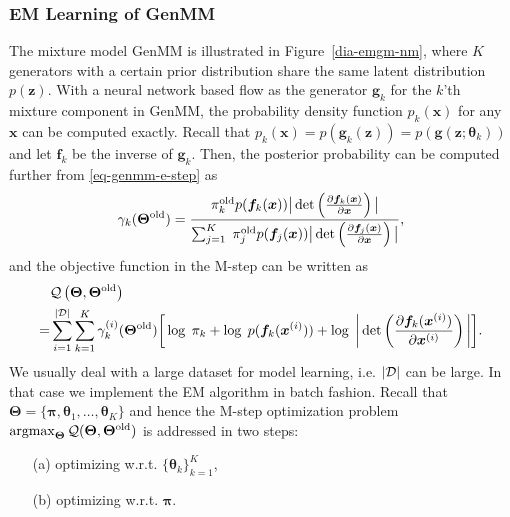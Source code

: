 \subsubsection{EM Learning of GenMM}
\label{sec-algo-genmm}
The mixture model GenMM is illustrated in Figure~\ref{dia-emgm-nm},
where $K$ generators with a certain prior distribution share the same
latent distribution $p(\bm{z})$. With a neural network based flow as the generator $\bm{g}_k$ for the $k$'th mixture component in GenMM, the probability density function $p_k(\bm{x})$ for any
$\bm{x}$ can be computed exactly. Recall that $p_k(\bm{x}) =  p(\bm{g}_k(\bm{z})) =p(\bm{g}(\bm{z};\bm{\theta}_k))$ and let $\bm{f}_k$ be the inverse of $\bm{g}_k$. Then, the posterior probability can be computed further from \eqref{eq-genmm-e-step} as
\begin{align}\label{eq-genmm-gamma}
  \gamma_k({\bm{\Theta}}^{\mathrm{old}}) = \frac{\pi_k^{\mathrm{old}} p(\bm{f}_k(\bm{x})) \big|\det\left( \frac{ \partial \bm{f}_k(\bm{x})}{\partial \bm{x}} \right)\big|}{\sum_{j=1}^K\; \pi_j^{\mathrm{old}} p(\bm{f}_j(\bm{x})) \big|\det\left( \frac{ \partial \bm{f}_j(\bm{x})}{\partial \bm{x}} \right)\big|},
\end{align}
and the objective function in the M-step can be written as
\begin{align}\label{eq-genmm-obj}
  &\mathcal{Q}\left(\bm{\Theta},\bm{\Theta}^{\mathrm{old}}\right)  \nonumber\\
  =&\sum_{i=1}^{| \mathcal{D} |} \sum_{k=1}^{K}\gamma_k^{(i)}(\bm{\Theta}^{\mathrm{old}})\bigg[ \log\;\pi_k +\log\;p(\bm{f}_k(\bm{x}^{(i)})) + \log\;\bigg|\det\left(\frac{ \partial \bm{f}_k(\bm{x}^{(i)})}{\partial \bm{x}^{(i)}} \right)\bigg|\bigg].
\end{align}
We usually deal with a large dataset for model learning, i.e. $| \mathcal{D} |$ can be large. In that case we implement the EM algorithm in batch fashion. 
Recall that $ \bm{\Theta}= \{\bm{\pi},\bm{\theta}_1, \dots, \bm{\theta}_K \}$ and hence the M-step optimization problem $\operatorname{argmax}_{\bm{\Theta}} \mathcal{Q} (\bm{\Theta},\bm{\Theta}^{\mathrm{old}})$ is addressed in two steps:
\begin{itemize}
\item[(a)] optimizing w.r.t. $\{ \bm{\theta}_k \}_{k=1}^{K}$,
\item[(b)] optimizing w.r.t. $\bm{\pi}$.
\end{itemize}

